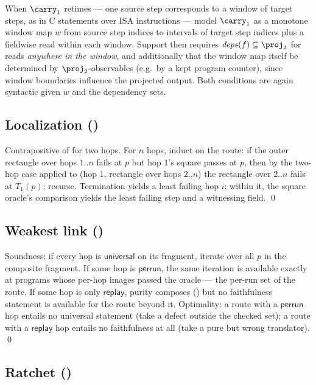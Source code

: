 When $\carry_1$ retimes --- one source step corresponds to a window of
target steps, as in C statements over ISA instructions --- model
$\carry_1$ as a monotone window map $w$ from source step indices to
intervals of target step indices plus a fieldwise read within each
window. Support then requires $\mathit{deps}(f) \subseteq \proj_2$ for
reads \emph{anywhere in the window}, and additionally that the window map
itself be determined by $\proj_2$-observables (e.g.\ by a kept program
counter), since window boundaries influence the projected output. Both
conditions are again syntactic given $w$ and the dependency sets.

\subsection{Localization ()}

Contrapositive of  for two hops. For $n$ hops, induct
on the route: if the outer rectangle over hops $1..n$ fails at $p$ but
hop $1$'s square passes at $p$, then by the two-hop case applied to
(hop 1, rectangle over hops $2..n$) the rectangle over $2..n$ fails at
$T_1(p)$; recurse. Termination yields a least failing hop $i$; within
it, the square oracle's comparison yields the least failing step and a
witnessing field. \qed

\subsection{Weakest link ()}

Soundness: if every hop is $\mathsf{universal}$ on its fragment, iterate
 over all $p$ in the composite fragment. If some hop is
$\mathsf{perrun}$, the same iteration is available exactly at programs
whose per-hop images passed the oracle --- the per-run set of the route.
If some hop is only $\mathsf{replay}$, purity composes
() but no faithfulness statement is available for the
route beyond it. Optimality: a route with a $\mathsf{perrun}$ hop entails
no universal statement (take a defect outside the checked set); a route
with a $\mathsf{replay}$ hop entails no faithfulness at all (take a pure
but wrong translator). \qed

\subsection{Ratchet ()}

